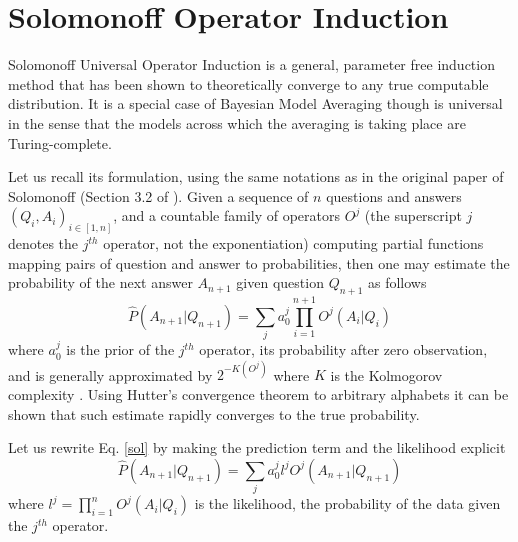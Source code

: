 \documentclass[runningheads]{llncs}
\begin{document}


\section{Solomonoff Operator Induction}
\label{sol-op-ind}
Solomonoff Universal Operator Induction \cite{Solomonoff08Three} is a
general, parameter free induction method that has been shown to
theoretically converge to any true computable distribution.  It is a
special case of Bayesian Model Averaging \cite{Hoeting99bayesianmodel}
though is universal in the sense that the models across which the
averaging is taking place are Turing-complete.

Let us recall its formulation, using the same notations as in the
original paper of Solomonoff (Section 3.2 of
\cite{Solomonoff08Three}). Given a sequence of $n$ questions and
answers $(Q_i, A_i)_{i \in [1, n]}$, and a countable family of
operators $O^j$ (the superscript $j$ denotes the $j^{th}$ operator,
not the exponentiation) computing partial functions mapping pairs of
question and answer to probabilities, then one may estimate the
probability of the next answer $A_{n+1}$ given question $Q_{n+1}$ as
follows
\begin{equation}
  \label{sol}
  \hat{P}(A_{n+1}|Q_{n+1}) = \sum_j a_0^j \prod_{i=1}^{n+1} O^j(A_i|Q_i)
\end{equation}
where $a_0^j$ is the prior of the $j^{th}$ operator, its probability
after zero observation, and is generally approximated by $2^{-K(O^j)}$
where $K$ is the Kolmogorov complexity
\cite{Li97anintroduction}. Using Hutter's convergence theorem to
arbitrary alphabets \cite{Hutter03Optimality} it can be shown that
such estimate rapidly converges to the true probability.

Let us rewrite Eq. \ref{sol} by making the prediction term and the
likelihood explicit
\begin{equation}
  \label{sol-eas}
\hat{P}(A_{n+1}|Q_{n+1}) = \sum_j a_0^j l^j O^j(A_{n+1}|Q_{n+1})
\end{equation}
where $l^j = \prod_{i=1}^{n} O^j(A_i|Q_i)$ is the likelihood, the
probability of the data given the $j^{th}$ operator.
\end{document}
